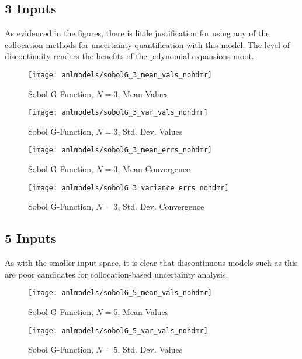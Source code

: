 \subsection{3 Inputs}
As evidenced in the figures, there is little justification for using any of the collocation methods for
uncertainty quantification with this model.  The level of discontinuity renders the benefits of the polynomial
expansions moot.
\begin{figure}[H]
  \centering
  \texttt{[image: anlmodels/sobolG\_3\_mean\_vals\_nohdmr]}
  \caption{Sobol G-Function, $N=3$, Mean Values}
  \label{fig:sobolG mean values 3}
\end{figure}
\begin{figure}[H]
  \centering
  \texttt{[image: anlmodels/sobolG\_3\_var\_vals\_nohdmr]}
  \caption{Sobol G-Function, $N=3$, Std. Dev. Values}
  \label{fig:sobolG var values 3}
\end{figure}

\begin{figure}[H]
  \centering
  \texttt{[image: anlmodels/sobolG\_3\_mean\_errs\_nohdmr]}
  \caption{Sobol G-Function, $N=3$, Mean Convergence}
  \label{fig:sobolG mean errors 3}
\end{figure}
\begin{figure}[H]
  \centering
  \texttt{[image: anlmodels/sobolG\_3\_variance\_errs\_nohdmr]}
  \caption{Sobol G-Function, $N=3$, Std. Dev. Convergence}
  \label{fig:sobolG var errors 3}
\end{figure}

\subsection{5 Inputs}
As with the smaller input space, it is clear that discontinuous models such as this are poor candidates for
collocation-based uncertainty analysis.
\begin{figure}[H]
  \centering
  \texttt{[image: anlmodels/sobolG\_5\_mean\_vals\_nohdmr]}
  \caption{Sobol G-Function, $N=5$, Mean Values}
  \label{fig:sobolG mean values 5}
\end{figure}
\begin{figure}[H]
  \centering
  \texttt{[image: anlmodels/sobolG\_5\_var\_vals\_nohdmr]}
  \caption{Sobol G-Function, $N=5$, Std. Dev. Values}
  \label{fig:sobolG var values 5}
\end{figure}

